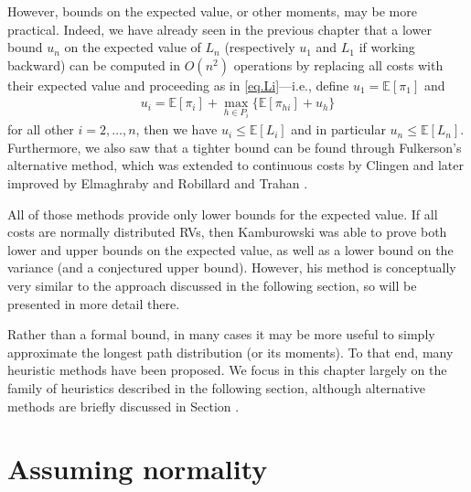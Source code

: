 \documentclass[12pt]{article}
\def\E{\mathbb{E}}
\begin{document}
However, bounds on the expected value, or other moments, may be more practical. Indeed, we have already seen in the previous chapter that a lower bound $u_n$ on the expected value of $L_n$ (respectively $u_1$ and $L_1$ if working backward) can be computed in $O(n^2)$ operations by replacing all costs with their expected value and proceeding as in \eqref{eq.Li}---i.e., define $u_1 = \E[\pi_1]$ and
\begin{align}
  \label{eq.ui}
  u_i = \E[\pi_i] + \max_{h \in P_i}\{ \E[\pi_{hi}] + u_h\}
\end{align}
for all other $i = 2, \dots, n$, then we have $u_i \leq \E[L_i]$ and in particular $u_n \leq \E[L_n]$. Furthermore, we also saw that a tighter bound can be found through Fulkerson's \cite{ful62} alternative method, which was extended to continuous costs by Clingen \cite{cli64} and later improved by Elmaghraby \cite{elm67} and Robillard and Trahan \cite{rob76}.

All of those methods provide only lower bounds for the expected value. If all costs are normally distributed RVs, then Kamburowski \cite{kam85} was able to prove both lower and upper bounds on the expected value, as well as a lower bound on the variance (and a conjectured upper bound). However, his method is conceptually very similar to the approach discussed in the following section, so will be presented in more detail there.

Rather than a formal bound, in many cases it may be more useful to simply approximate the longest path distribution (or its moments). To that end, many heuristic methods have been proposed. We focus in this chapter largely on the family of heuristics described in the following section, although alternative methods are briefly discussed in Section .

\section{Assuming normality}
\label{sect.normality}
\end{document}
